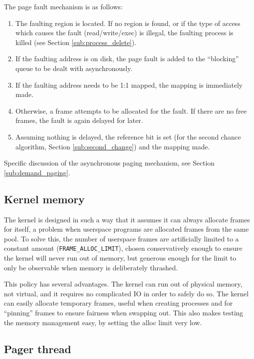 \documentclass[12pt,english]{article}
\begin{document}
The page fault mechanism is as follows:
\begin{enumerate}
\item The faulting region is located.  If no region is found, or if the type of access which causes the fault (read/write/exec) is illegal, the faulting process is killed (see Section \ref{sub:process_delete}).
\item If the faulting address is on disk, the page fault is added to the ``blocking'' queue to be dealt with asynchronously.\item If the faulting address needs to be 1:1 mapped, the mapping is immediately made.
\item Otherwise, a frame attempts to be allocated for the fault.  If there are no free frames, the fault is again delayed for later.
\item Assuming nothing is delayed, the reference bit is set (for the second chance algorithm, Section \ref{sub:second_change}) and the mapping made.
\end{enumerate}

Specific discussion of the asynchronous paging mechanism, see Section \ref{sub:demand_paging}.

\subsection{Kernel memory}

The kernel is designed in such a way that it assumes it can always allocate frames for itself, a problem when userspace programs are allocated frames from the same pool.  To solve this, the number of userspace frames are artificially limited to a constant amount (\texttt{FRAME\_ALLOC\_LIMIT}), chosen conservatively enough to ensure the kernel will never run out of memory, but generous enough for the limit to only be observable when memory is deliberately thrashed.

This policy has several advantages.  The kernel can run out of physical memory, not virtual, and it requires no complicated IO in order to safely do so.  The kernel can easily allocate temporary frames, useful when creating processes and for ``pinning'' frames to ensure fairness when swapping out.  This also makes testing the memory management easy, by setting the alloc limit very low.

\subsection{Pager thread}
\end{document}
